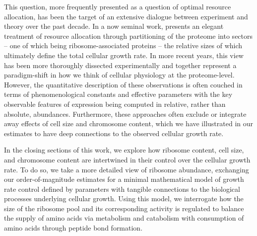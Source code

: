 This question, more frequently presented as a question of optimal resource
allocation, has been the target of an extensive dialogue between experiment and
theory over the past decade. In a now seminal work,
\cite{scott2010} presents an elegant treatment of resource allocation through
partitioning of the proteome into sectors -- one of which being
ribosome-associated proteins -- the relative sizes of which ultimately define
the total cellular growth rate. In more recent years, this view has been more
thoroughly dissected experimentally 
\citep{klumpp2014,basan2015,dai2018, dai2016, erickson2017} and together
represent a paradigm-shift in how we think of cellular physiology at the
proteome-level. However, the quantitative description of these  observations is
often couched in terms of phenomenological constants and effective parameters
with the key observable features of expression being computed in relative, rather
than absolute, abundances. Furthermore, these approaches often exclude or
integrate away effects of cell size and chromosome content, which we have
illustrated in our estimates to have deep connections to the observed cellular
growth rate.

In the closing sections of this work, we explore how ribosome content, cell
size, and chromosome content are intertwined in their control over the cellular
growth rate. To do so, we take a more detailed view of ribosome abundance,
exchanging our order-of-magnitude estimates for a minimal mathematical model of
growth rate control defined by parameters with tangible connections to the
biological processes underlying cellular growth. Using this model, we
interrogate how the size of the ribosome pool and its corresponding activity is
regulated to balance the supply of amino acids via metabolism and catabolism
with consumption of amino acids through peptide bond formation.

